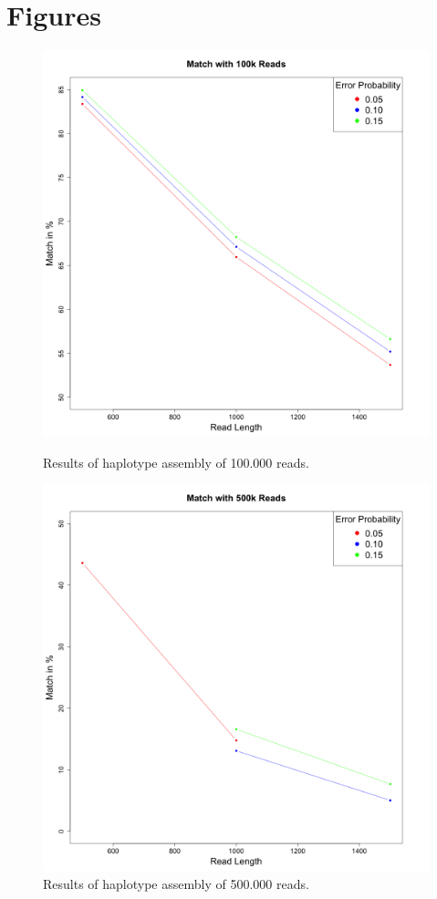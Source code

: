 \documentclass[10pt,a4paper]{article}
\begin{document}
\section{Figures}
\begin{figure}[!ht]
\centering
\label{fig:100k}
\includegraphics[height=0.43\textheight]{../output/plots/plot100k}
\caption{\footnotesize Results of haplotype assembly of 100.000 reads.}
\label{fig:500k}
\includegraphics[height=0.43\textheight]{../output/plots/plot500k}
\caption{\footnotesize Results of haplotype assembly of 500.000 reads.}
\end{figure}
\end{document}
